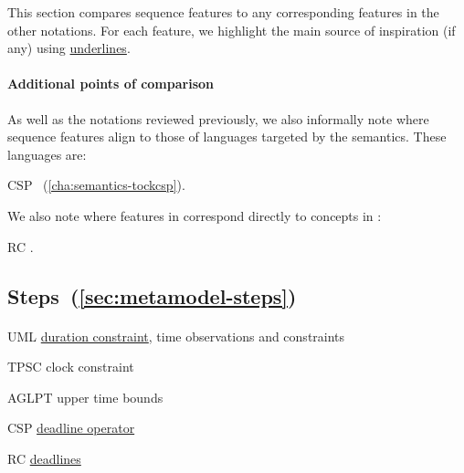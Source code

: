 \newcommand{\insp}[1]{\ul{#1}}

This section compares \langname{} sequence features to any
corresponding features in the other notations.
For each feature, we highlight the main source of inspiration (if any)
using \insp{underlines}.

\paragraph{Additional points of comparison}

As well as the notations reviewed previously, we also
informally note where \langname{} sequence features align to those of
languages targeted by the \langname{} semantics.  These languages are:

\begin{featset}
\item[CSP] \tockcsp~(\autoref{cha:semantics-tockcsp}).
\end{featset}

We also note where features in \langname{} correspond directly to concepts
in \robochart{} :

\begin{featset}
\item[RC] \robochart.
\end{featset}

\subsection{Steps~(\ref{sec:metamodel-steps})}

\paragraph{\mdeadlinestep}
\begin{featset}
\item[UML] \insp{duration constraint}, time observations and constraints
\item[TPSC] clock constraint
\item[AGLPT] upper time bounds
\item[CSP] \insp{deadline operator}
\item[RC] \insp{deadlines}
\end{featset}

